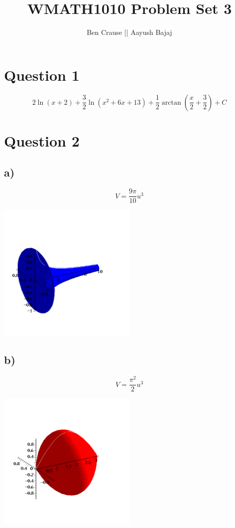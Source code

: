 \documentclass[12pt]{article}
\title{WMATH1010 Problem Set 3}
\author{Ben Crause || Aayush Bajaj}
\begin{document}
\maketitle{}

\section*{Question 1}
\[
    2\ln(x+2) + \frac{3}{2} \ln(x^2 + 6x + 13) + \frac{1}{2} \arctan(\frac{x}{2} + \frac{3}{2}) + C
\]

\section*{Question 2}

\subsection*{a)}
\[V = \frac{9 \pi}{10} u^3\]

\begin{center}\includegraphics[width=0.5\textwidth, trim={2cm 1cm 2cm 3cm},clip]{plots/q2a.png}\end{center}

\newpage
\subsection*{b)}
\[
    V = \frac{\pi^2}{2}u^3    
\]
\begin{center}\includegraphics[width=0.5\textwidth, trim={2cm 1cm 2cm 3cm},clip]{plots/q2b.png}\end{center}
\end{document}
